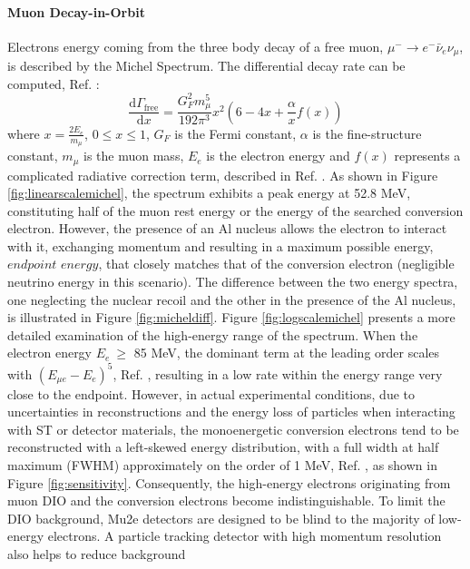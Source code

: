 \paragraph{Muon Decay-in-Orbit}
Electrons energy coming from the three body decay of a free muon, 
$\mu^- \rightarrow e^- \bar{\nu}_e \nu_\mu$, is described by the Michel 
Spectrum. The differential decay rate can be computed, Ref. \cite{michel}:
\begin{equation}
    \frac{\text{d}\Gamma_{\text{free}}}{\text{d}x}= \frac{G^2_F m^5_\mu}{192 \pi^3}x^2(6-4x+\frac{\alpha}{x}f(x)) 
\end{equation}
where $x=\frac{2 E_e}{m_\mu}$, $0\leq x\leq 1$, $G_F$ is the Fermi constant, 
$\alpha$ is the fine-structure constant, $m_\mu$ is the muon mass, $E_e$ is the 
electron energy and $f (x)$ represents a complicated radiative correction term, 
described in Ref. \cite{PhysRev.113.1652}. 
As shown in Figure \ref{fig:linearscalemichel}, the spectrum exhibits a peak energy 
at 52.8 MeV, constituting half of the muon rest energy  or the energy of the searched 
conversion electron. However, the presence of an Al nucleus allows the electron to 
interact with it, exchanging momentum and resulting in a maximum possible energy, 
$endpoint$ $energy$, that closely matches that of the conversion electron (negligible 
neutrino energy in this scenario). The difference between the two energy spectra, one 
neglecting the nuclear recoil and the 
other in the presence of the Al nucleus, is illustrated in Figure \ref{fig:micheldiff}. 
Figure \ref{fig:logscalemichel} presents a more detailed examination of the high-energy 
range of the spectrum. When the electron energy $E_e \ \geq$ 85 MeV, the dominant term 
at the leading order scales with $(E_{\mu e} - E_e)^5$, Ref. \cite{PhysRevD.84.013006}, 
resulting in a low rate within the energy range very close to the endpoint. However, in 
actual experimental conditions, due to uncertainties in reconstructions and the energy 
loss of particles when interacting with ST or detector materials, the monoenergetic 
conversion electrons tend to be reconstructed with a left-skewed energy distribution, 
with a full width at half maximum (FWHM) approximately on the order of 1 MeV, Ref. 
\cite{gaponenko}, as shown in Figure \ref{fig:sensitivity}. Consequently, the 
high-energy electrons originating from muon DIO and the conversion electrons 
become indistinguishable. To limit the DIO background, Mu2e detectors are 
designed to be blind to the majority of low-energy electrons. A particle 
tracking detector with high momentum resolution also helps to reduce background 
